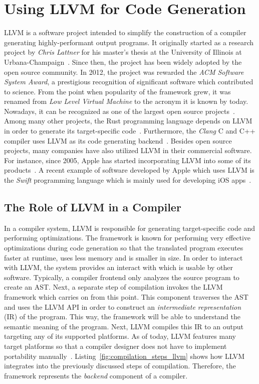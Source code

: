 \section{Using LLVM for Code Generation}

LLVM is a software project intended to simplify the construction of a compiler generating highly-performant output programs.
It originally started as a research project by \emph{Chris Lattner} for his master's thesis at the University of Illinois at Urbana-Champaign~\cite{Lattner:MSThesis02}.
Since then, the project has been widely adopted by the open source community.
In 2012, the project was rewarded the \emph{ACM Software System Award}, a prestigious recognition of significant software which contributed to science.
From the point when popularity of the framework grew, it was renamed from \emph{Low Level Virtual Machine} to the acronym it is known by today.
Nowadays, it can be recognized as one of the largest open source projects~\cite[preface]{Cardoso_Lopes2014-jt}.
Among many other projects, the Rust programming language depends on LLVM in order to generate its target-specific code~\cite[p.~373]{McNamara2021-hz}.
Furthermore, the \emph{Clang} C and C++ compiler uses LLVM as its code generating backend~\cite[preface]{Hsu2021-ez}.
Besides open source projects, many companies have also utilized LLVM in their commercial software.
For instance, since 2005, Apple has started incorporating LLVM into some of its products~\cite[pp.~11-15]{Fandrey}.
A recent example of software developed by Apple which uses LLVM is the \emph{Swift} programming language which is mainly used for developing iOS apps~\cite[preface]{Hsu2021-ez}.

\subsection{The Role of LLVM in a Compiler}

In a compiler system, LLVM is responsible for generating target-specific code and performing optimizations.
The framework is known for performing very effective optimizations during code generation so that the translated program executes faster at runtime, uses less memory and is smaller in size.
In order to interact with LLVM, the system provides an interact with which is usable by other software\@.
Typically, a compiler frontend only analyzes the source program to create an AST\@.
Next, a separate step of compilation invokes the LLVM framework which carries on from this point\@.
This component traverses the AST and uses the LLVM API in order to construct an \emph{intermediate representation} (IR) of the program.
This way, the framework will be able to understand the semantic meaning of the program.
Next, LLVM compiles this IR to an output targeting any of its supported platforms.
As of today, LLVM features many target platforms so that a compiler designer does not have to implement portability manually~\cite[preface]{Hsu2021-ez}.
Listing~\ref{fig:compilation_steps_llvm} shows how LLVM integrates into the previously discussed steps of compilation.
Therefore, the framework represents the \emph{backend} component of a compiler.

